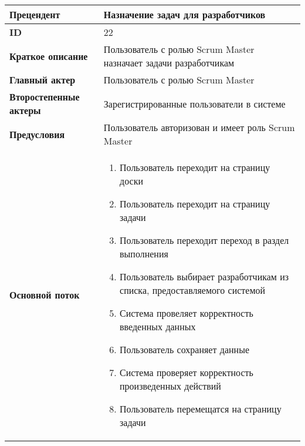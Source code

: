 \documentclass[14pt,a4paper]{extarticle}
\begin{document}
\begin{tabular}{|l|p{9cm}|}
	\hline
	\textbf{Прецендент}            & Назначение задач для разработчиков                                            \\
	\hline
	\textbf{ID}                    & 22                                                                            \\
	\hline
	\textbf{Краткое описание}      & Пользователь с ролью Scrum Master назначает задачи разработчикам              \\
	\hline
	\textbf{Главный актер}         & Пользователь с ролью Scrum Master                                             \\
	\hline
	\textbf{Второстепенные актеры} & Зарегистрированные пользователи в системе                                     \\
	\hline
	\textbf{Предусловия}           & Пользователь авторизован и имеет роль Scrum Master                            \\
	\hline
	\textbf{Основной поток}        & \begin{enumerate}
		                                 \item Пользователь переходит на страницу доски
		                                 \item Пользователь переходит на страницу задачи
		                                 \item Пользователь переходит переход в раздел выполнения
		                                 \item Пользователь выбирает разработчикам из списка, предоставляемого системой
		                                 \item Система провеляет корректность введенных данных
		                                 \item Пользователь сохраняет данные
		                                 \item Система проверяет корректность произведенных действий
		                                 \item Пользователь перемещатся на страницу задачи
	                                 \end{enumerate} \\
	\hline
\end{tabular}


\printnoidxglossaries
\end{document}
